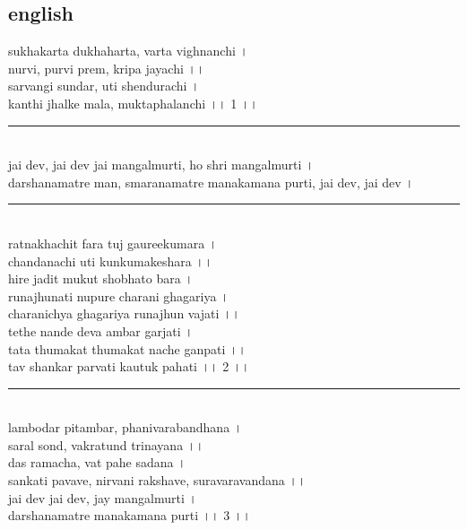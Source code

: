 \documentclass[letterpaper,twocolumn,openany,nodeprecatedcode]{dndbook}
\begin{document}
\begin{flushleft}
  \subsection*{english}
  sukhakarta dukhaharta, varta vighnanchi । \\
  nurvi, purvi prem, kripa jayachi ।।\\
  sarvangi sundar, uti shendurachi ।\\
  kanthi jhalke mala, muktaphalanchi ।। 1 ।। \\
  \rule{\linewidth}{1pt} \\
  jai dev, jai dev jai mangalmurti, ho shri mangalmurti । \\
  darshanamatre man, smaranamatre manakamana purti, jai dev, jai dev । \\
  \rule{\linewidth}{1pt} \\
  ratnakhachit fara tuj gaureekumara । \\
  chandanachi uti kunkumakeshara ।। \\
  hire jadit mukut shobhato bara । \\
  runajhunati nupure charani ghagariya । \\
  charanichya ghagariya runajhun vajati ।। \\
  tethe nande deva ambar garjati । \\
  tata thumakat thumakat nache ganpati ।। \\
  tav shankar parvati kautuk pahati ।। 2 ।।\\
  \rule{\linewidth}{1pt} \\
  lambodar pitambar, phanivarabandhana । \\
  saral sond, vakratund trinayana ।। \\
  das ramacha, vat pahe sadana । \\
  sankati pavave, nirvani rakshave, suravaravandana ।। \\
  jai dev jai dev, jay mangalmurti । \\
  darshanamatre manakamana purti ।। 3 ।। \\
\end{flushleft}
\pagebreak
\end{document}
